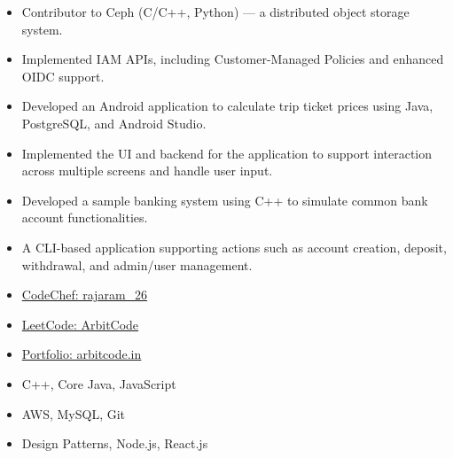 \documentclass[10pt,a4paper,withhyper]{altacv}
\begin{document}
\begin{paracol}{2}
 \begin{itemize}
     \item Contributor to Ceph (C/C++, Python) — a distributed object storage system.
     \item Implemented IAM APIs, including Customer-Managed Policies and enhanced OIDC support.

 \end{itemize}

\begin{itemize}
    \item Developed an Android application to calculate trip ticket prices using Java, PostgreSQL, and Android Studio.
    \item Implemented the UI and backend for the application to support interaction across multiple screens and handle user input.
\end{itemize}
\begin{itemize}
    \item Developed a sample banking system using C++ to simulate common bank account functionalities.
    \item A CLI-based application supporting actions such as account creation, deposit, withdrawal, and admin/user management.
\end{itemize}

  \begin{itemize}
  \item \href{https://www.codechef.com/users/rajaram_26}{CodeChef: rajaram\_26}
  \item \href{https://leetcode.com/ArbitCode}{LeetCode: ArbitCode}
  \item \href{https://arbitcode.in}{Portfolio: arbitcode.in}
  \end{itemize}

  \begin{itemize}
    \item C++, Core Java, JavaScript
    \item AWS, MySQL, Git
    \item Design Patterns, Node.js, React.js
  \end{itemize}


\end{paracol}
\end{document}
